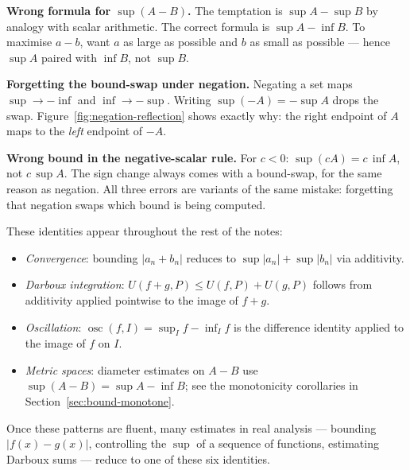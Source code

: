 \begin{remark*}
\textbf{Wrong formula for $\sup(A-B)$.}
The temptation is $\sup A - \sup B$ by analogy with scalar arithmetic.
The correct formula is $\sup A - \inf B$.
To maximise $a - b$, want $a$ as large as possible and $b$ as small as
possible — hence $\sup A$ paired with $\inf B$, not $\sup B$.

\medskip\noindent
\textbf{Forgetting the bound-swap under negation.}
Negating a set maps $\sup \to -\inf$ and $\inf \to -\sup$.
Writing $\sup(-A) = -\sup A$ drops the swap.
Figure~\ref{fig:negation-reflection} shows exactly why: the right endpoint
of $A$ maps to the \emph{left} endpoint of $-A$.

\medskip\noindent
\textbf{Wrong bound in the negative-scalar rule.}
For $c < 0$: $\sup(cA) = c\,\inf A$, not $c\,\sup A$.
The sign change always comes with a bound-swap, for the same reason as
negation.
All three errors are variants of the same mistake: forgetting that
negation swaps which bound is being computed.
\end{remark*}

\begin{remark*}
These identities appear throughout the rest of the notes:
\begin{itemize}
  \item \emph{Convergence}: bounding $|a_n + b_n|$ reduces to
        $\sup|a_n| + \sup|b_n|$ via additivity.
  \item \emph{Darboux integration}: $U(f+g,P) \le U(f,P) + U(g,P)$
        follows from additivity applied pointwise to the image of $f+g$.
  \item \emph{Oscillation}: $\operatorname{osc}(f,I) = \sup_I f - \inf_I f$
        is the difference identity applied to the image of $f$ on $I$.
  \item \emph{Metric spaces}: diameter estimates on $A - B$ use
        $\sup(A-B) = \sup A - \inf B$; see the monotonicity corollaries
        in Section~\ref{sec:bound-monotone}.
\end{itemize}

Once these patterns are fluent, many estimates in real analysis —
bounding $|f(x) - g(x)|$, controlling the $\sup$ of a sequence of
functions, estimating Darboux sums — reduce to one of these six identities.
\end{remark*}